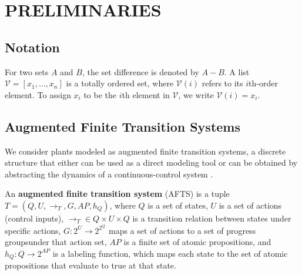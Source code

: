 \section{PRELIMINARIES}
\label{sec:pre}
\subsection{Notation}

For two sets $ A $ and $ B $, the set difference is denoted by $ A-B $. 
A list $ \mathcal{V}=[x_1,...,x_n] $ is a totally ordered set, where $ \mathcal{V}(i) $ refers to its $ i $th-order element. 
To assign $ x_i $ to be the $ i $th element in	 $ \mathcal{V} $, we write $ \mathcal{V}(i) = x_i $. %

\subsection{Augmented Finite Transition Systems}

We consider plants modeled as augmented finite transition systems, a discrete structure that either can be used as a direct modeling tool or can be obtained by abstracting the dynamics of a continuous-control system \cite{Nilsson2017}.

\begin{definition}
	An \textbf{augmented finite transition system} (AFTS) is a tuple $ T = (Q,U,\rightarrow_T, G,AP,h_Q) $, where $ Q $ is a set of states, $U$ is a set of actions (control inputs), $ \rightarrow_T\in Q\times U \times Q $ is a transition relation between states under specific actions, $ G: 2^U\rightarrow 2^{2^Q} $ maps a set of actions to a set of progress groups\footnotemark under that action set, $ AP $ is a finite set of atomic propositions, and $ h_Q: Q\rightarrow 2^{AP} $ is a labeling function, which maps each state to the set of atomic propositions that evaluate to true at that state. 
\end{definition}

